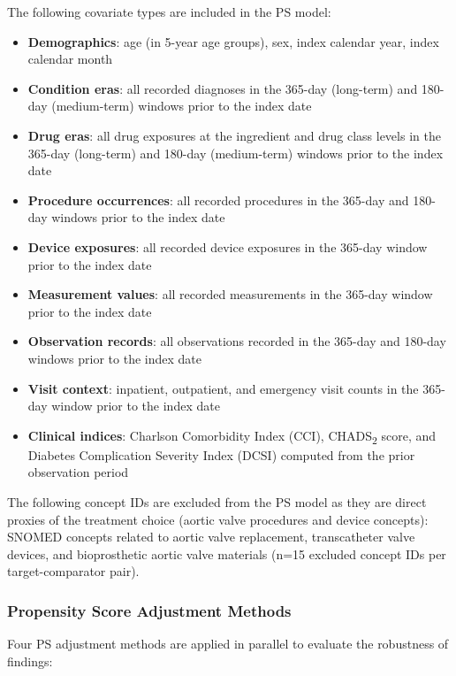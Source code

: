 \documentclass[
  12pt,
]{article}
\providecommand{\tightlist}{%
  \setlength{\itemsep}{0pt}\setlength{\parskip}{0pt}}
\begin{document}
The following covariate types are included in the PS model:

\begin{itemize}
\tightlist
\item
  \textbf{Demographics}: age (in 5-year age groups), sex, index calendar
  year, index calendar month
\item
  \textbf{Condition eras}: all recorded diagnoses in the 365-day
  (long-term) and 180-day (medium-term) windows prior to the index date
\item
  \textbf{Drug eras}: all drug exposures at the ingredient and drug
  class levels in the 365-day (long-term) and 180-day (medium-term)
  windows prior to the index date
\item
  \textbf{Procedure occurrences}: all recorded procedures in the 365-day
  and 180-day windows prior to the index date
\item
  \textbf{Device exposures}: all recorded device exposures in the
  365-day window prior to the index date
\item
  \textbf{Measurement values}: all recorded measurements in the 365-day
  window prior to the index date
\item
  \textbf{Observation records}: all observations recorded in the 365-day
  and 180-day windows prior to the index date
\item
  \textbf{Visit context}: inpatient, outpatient, and emergency visit
  counts in the 365-day window prior to the index date
\item
  \textbf{Clinical indices}: Charlson Comorbidity Index (CCI),
  CHADS\textsubscript{2} score, and Diabetes Complication Severity Index
  (DCSI) computed from the prior observation period
\end{itemize}

The following concept IDs are excluded from the PS model as they are
direct proxies of the treatment choice (aortic valve procedures and
device concepts): SNOMED concepts related to aortic valve replacement,
transcatheter valve devices, and bioprosthetic aortic valve materials
(n=15 excluded concept IDs per target-comparator pair).

\subsubsection{Propensity Score Adjustment
Methods}\label{propensity-score-adjustment-methods}

Four PS adjustment methods are applied in parallel to evaluate the
robustness of findings:
\end{document}
